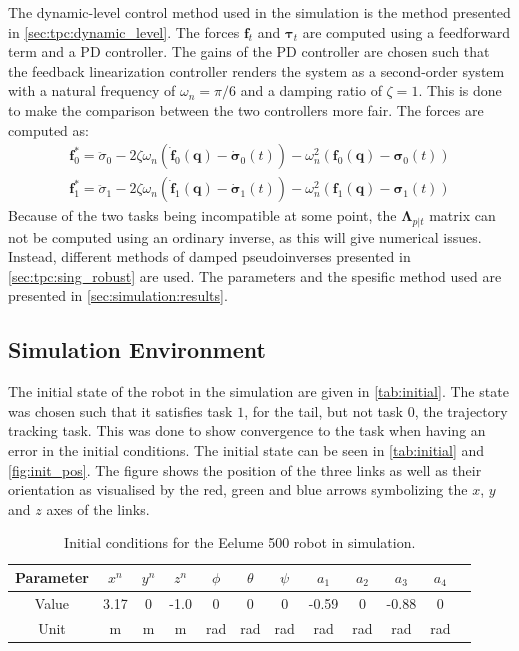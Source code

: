 The dynamic-level control method used in the simulation is the method presented in \autoref{sec:tpc:dynamic_level}. The forces $\bm{f}_t$ and $\bm{\tau}_t$ are computed using
a feedforward term and a PD controller. The gains of the PD controller are chosen
such that the feedback linearization controller renders the system as a second-order
system with a natural frequency of $\omega_n = \pi/6$ and a damping ratio of $\zeta = 1$.
This is done to make the comparison between the two controllers more fair. The forces
are computed as:
\begin{subequations}
\begin{align}
    \bm{f}_0^* = \ddot{\sigma}_0
    - 2 \zeta \omega_n \left(\dot{\bm{f}}_0(\bm{q}) - \dot{\bm{\sigma}}_0(t)\right)
    - \omega_n^2 \left(\bm{f}_0(\bm{q}) - \bm{\sigma}_0(t)\right) \\
    \bm{f}_1^* = \ddot{\sigma}_1
    - 2 \zeta \omega_n \left(\dot{\bm{f}}_1(\bm{q}) - \dot{\bm{\sigma}}_1(t)\right)
    - \omega_n^2 \left(\bm{f}_1(\bm{q}) - \bm{\sigma}_1(t)\right)
\end{align}
\end{subequations}
Because of the two tasks being incompatible at some point, the $\bm{\Lambda}_{p|t}$
matrix can not be computed using an ordinary inverse, as this will give numerical issues.
Instead, different methods of damped pseudoinverses presented in \autoref{sec:tpc:sing_robust}
are used. The parameters and the spesific method used are presented in \autoref{sec:simulation:results}.

\subsection{Simulation Environment}

The initial state of the robot in the simulation are given in \autoref{tab:initial}.
The state was chosen such that it satisfies task $1$, for the tail,
but not task $0$, the trajectory tracking task. This was done to show convergence
to the task when having an error in the initial conditions. The initial state
can be seen in \autoref{tab:initial} and \autoref{fig:init_pos}. The figure
shows the position of the three links as well as their orientation as visualised
by the red, green and blue arrows symbolizing the $x$, $y$ and $z$ axes of the
links.
\begin{table}[h!]
    \centering
    \begin{tabular}{|c|c|c|c|c|c|c|c|c|c|c|c|}
        \hline
        Parameter & $x^n$ & $y^n$ & $z^n$ & $\phi$ & $\theta$ & $\psi$ & $a_1$ & $a_2$ & $a_3$ & $a_4$ \\ \hline
        Value & 3.17 & 0 & -1.0 & 0 & 0 & 0 & -0.59 & 0 & -0.88 & 0 \\ \hline
        Unit & m & m & m & rad & rad & rad & rad & rad & rad & rad \\
        \hline
    \end{tabular}
    \caption{Initial conditions for the Eelume 500 robot in simulation.}
    \label{tab:initial}
\end{table}

